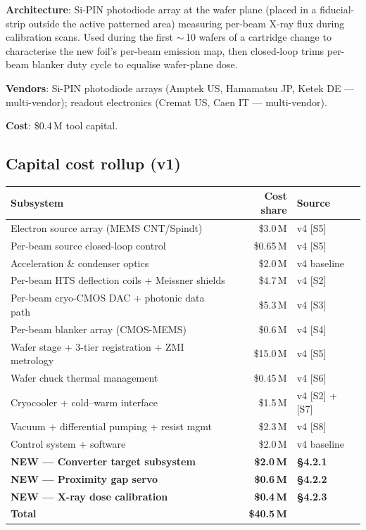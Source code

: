 \documentclass[11pt,letterpaper]{article}
\begin{document}
\textbf{Architecture}: Si-PIN photodiode array at the wafer plane (placed in a fiducial-strip outside the active patterned area) measuring per-beam X-ray flux during calibration scans. Used during the first $\sim$\,10 wafers of a cartridge change to characterise the new foil's per-beam emission map, then closed-loop trims per-beam blanker duty cycle to equalise wafer-plane dose.

\textbf{Vendors}: Si-PIN photodiode arrays (Amptek US, Hamamatsu JP, Ketek DE --- multi-vendor); readout electronics (Cremat US, Caen IT --- multi-vendor).

\textbf{Cost}: \$0.4\,M tool capital.

\subsection{Capital cost rollup (v1)}

\begin{center}
\begin{tabular}{lrl}
\toprule
Subsystem & Cost share & Source \\
\midrule
Electron source array (MEMS CNT/Spindt) & \$3.0\,M & v4 [S5] \\
Per-beam source closed-loop control & \$0.65\,M & v4 [S5] \\
Acceleration \& condenser optics & \$2.0\,M & v4 baseline \\
Per-beam HTS deflection coils + Meissner shields & \$4.7\,M & v4 [S2] \\
Per-beam cryo-CMOS DAC + photonic data path & \$5.3\,M & v4 [S3] \\
Per-beam blanker array (CMOS-MEMS) & \$0.6\,M & v4 [S4] \\
Wafer stage + 3-tier registration + ZMI metrology & \$15.0\,M & v4 [S5] \\
Wafer chuck thermal management & \$0.45\,M & v4 [S6] \\
Cryocooler + cold--warm interface & \$1.5\,M & v4 [S2] + [S7] \\
Vacuum + differential pumping + resist mgmt & \$2.3\,M & v4 [S8] \\
Control system + software & \$2.0\,M & v4 baseline \\
\textbf{NEW --- Converter target subsystem} & \textbf{\$2.0\,M} & \textbf{\S 4.2.1} \\
\textbf{NEW --- Proximity gap servo} & \textbf{\$0.6\,M} & \textbf{\S 4.2.2} \\
\textbf{NEW --- X-ray dose calibration} & \textbf{\$0.4\,M} & \textbf{\S 4.2.3} \\
\midrule
\textbf{Total} & \textbf{\$40.5\,M} & \\
\bottomrule
\end{tabular}
\end{center}
\end{document}
